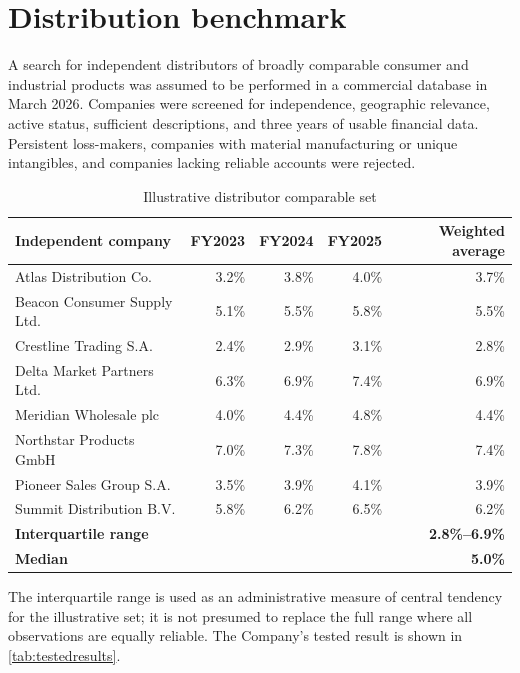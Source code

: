 \section{Distribution benchmark}
A search for independent distributors of broadly comparable consumer and
industrial products was assumed to be performed in a commercial database in
March 2026. Companies were screened for independence, geographic relevance,
active status, sufficient descriptions, and three years of usable financial
data. Persistent loss-makers, companies with material manufacturing or unique
intangibles, and companies lacking reliable accounts were rejected.

\begin{table}[htbp]
  \centering
  \caption{Illustrative distributor comparable set}
  \label{tab:distcomp}
  \begin{tabularx}{\textwidth}{@{}Y r r r r@{}}
    \toprule
    \textbf{Independent company} & \textbf{FY2023} & \textbf{FY2024} &
      \textbf{FY2025} & \textbf{Weighted average}\\
    \midrule
    Atlas Distribution Co. & 3.2\% & 3.8\% & 4.0\% & 3.7\%\\
    Beacon Consumer Supply Ltd. & 5.1\% & 5.5\% & 5.8\% & 5.5\%\\
    Crestline Trading S.A. & 2.4\% & 2.9\% & 3.1\% & 2.8\%\\
    Delta Market Partners Ltd. & 6.3\% & 6.9\% & 7.4\% & 6.9\%\\
    Meridian Wholesale plc & 4.0\% & 4.4\% & 4.8\% & 4.4\%\\
    Northstar Products GmbH & 7.0\% & 7.3\% & 7.8\% & 7.4\%\\
    Pioneer Sales Group S.A. & 3.5\% & 3.9\% & 4.1\% & 3.9\%\\
    Summit Distribution B.V. & 5.8\% & 6.2\% & 6.5\% & 6.2\%\\
    \midrule
    \textbf{Interquartile range} & & & & \textbf{2.8\%--6.9\%}\\
    \textbf{Median} & & & & \textbf{5.0\%}\\
    \bottomrule
  \end{tabularx}
\end{table}

The interquartile range is used as an administrative measure of central tendency
for the illustrative set; it is not presumed to replace the full range where
all observations are equally reliable. The Company's tested result is shown in
\cref{tab:testedresults}.
